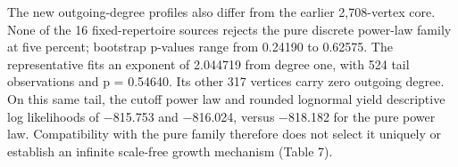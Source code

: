 \documentclass[pdflatex,sn-basic,Numbered]{sn-jnl}
\begin{document}
The new outgoing-degree profiles also differ from the earlier 2,708-vertex core. None of the 16 fixed-repertoire sources rejects the pure discrete power-law family at five percent; bootstrap p-values range from 0.24190 to 0.62575. The representative fits an exponent of 2.044719 from degree one, with 524 tail observations and p = 0.54640. Its other 317 vertices carry zero outgoing degree. On this same tail, the cutoff power law and rounded lognormal yield descriptive log likelihoods of \ensuremath{-}815.753 and \ensuremath{-}816.024, versus \ensuremath{-}818.182 for the pure power law. Compatibility with the pure family therefore does not select it uniquely or establish an infinite scale-free growth mechanism (Table 7).

\begingroup
\small
\setlength{\tabcolsep}{3pt}
\renewcommand{\arraystretch}{1.13}
\end{document}
